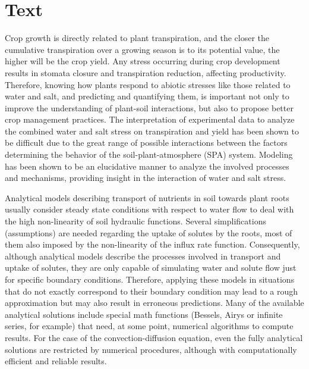 \section*{Text}

Crop growth is directly related to plant transpiration, and the closer the cumulative transpiration over a growing season is to its potential value, the higher will be the crop yield. 
Any stress occurring during crop development results in stomata closure and transpiration reduction, affecting productivity. 
Therefore, knowing how plants respond to abiotic stresses like those related to water and salt, and predicting and quantifying them, is important not only to improve the understanding of plant-soil interactions, but also to propose better crop management practices.
The interpretation of experimental data to analyze the combined water and salt stress on transpiration and yield has been shown to be difficult due to the great range of possible interactions between the factors determining the behavior of the soil-plant-atmosphere (SPA) system.
Modeling has been shown to be an elucidative manner to analyze the involved processes and mechanisms, providing insight in the interaction of water and salt stress.

Analytical models describing transport of nutrients in soil towards plant roots usually consider steady state conditions with respect to water flow to deal with the high non-linearity of soil hydraulic functions. 
Several simplifications (assumptions) are needed regarding the uptake of solutes by the roots, most of them also imposed by the non-linearity of the influx rate function. 
Consequently, although analytical models describe the processes involved in transport and uptake of solutes, they are only capable of simulating water and solute flow just for specific boundary conditions.
Therefore, applying these models in situations that do not exactly correspond to their boundary condition may lead to a rough approximation but may also result in erroneous predictions.
Many of the available analytical solutions include special math functions (Bessels, Airys or infinite series, for example) that need, at some point, numerical algorithms to compute results.
For the case of the convection-diffusion equation, even the fully analytical solutions are restricted by numerical procedures, although with computationally efficient and reliable results.

